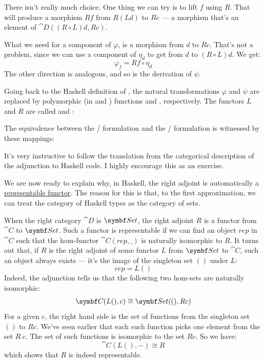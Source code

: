 There isn't really much choice. One thing we can try is to lift
$f$ using $R$. That will produce a morphism $R f$
from $R (L d)$ to $R c$ --- a morphism that's an
element of $\cat{D}((R \circ L) d, R c)$.

What we need for a component of $\varphi$, is a morphism from
$d$ to $R c$. That's not a problem, since we can use a
component of $\eta_d$ to get from $d$ to
$(R \circ L) d$. We get:
\[\varphi_f = R f \circ \eta_d\]
The other direction is analogous, and so is the derivation of $\psi$.

Going back to the Haskell definition of , the natural
transformations $\varphi$ and $\psi$ are replaced by polymorphic
(in  and ) functions  and
, respectively. The functors $L$ and
$R$ are called  and :

The equivalence between the / formulation
and the /\allowbreak{} formulation is
witnessed by these mappings:

It's very instructive to follow the translation from the categorical
description of the adjunction to Haskell code. I highly encourage this
as an exercise.

We are now ready to explain why, in Haskell, the right adjoint is
automatically a \hyperref[representable-functors]{representable
  functor}. The reason for this is that, to the first approximation, we
can treat the category of Haskell types as the category of sets.

When the right category $\cat{D}$ is $\Set$, the right adjoint
$R$ is a functor from $\cat{C}$ to $\Set$. Such a functor is
representable if we can find an object $rep$ in $\cat{C}$ such
that the hom-functor $\cat{C}(rep, \_)$ is naturally isomorphic to
$R$. It turns out that, if $R$ is the right adjoint of
some functor $L$ from $\Set$ to $\cat{C}$, such an object
always exists --- it's the image of the singleton set $()$ under
$L$:
\[rep = L ()\]
Indeed, the adjunction tells us that the following two hom-sets are
naturally isomorphic:
\[\cat{C}(L (), c) \cong \Set((), R c)\]
For a given $c$, the right hand side is the set of functions from
the singleton set $()$ to $R c$. We've seen earlier that
each such function picks one element from the set $R\ c$. The set
of such functions is isomorphic to the set $R c$. So we have:
\[\cat{C}(L (), -) \cong R\]
which shows that $R$ is indeed representable.

